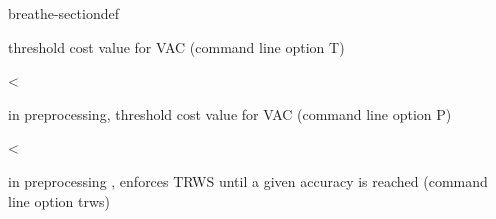 \documentclass[letterpaper,10pt,openany,oneside,english]{sphinxmanual}
\begin{document}
\begin{fulllineitems}
\begin{sphinxuseclass}{breathe-sectiondef}
\begin{fulllineitems}
\sphinxAtStartPar
threshold cost value for VAC (command line option \sphinxhyphen{}T) 

\end{fulllineitems}


\begin{fulllineitems}
\label{\detokenize{ref/ref_cpp:_CPPv4N8ToulBar212trwsAccuracyE}}\label{\detokenize{ref/ref_cpp:_CPPv3N8ToulBar212trwsAccuracyE}}\label{\detokenize{ref/ref_cpp:_CPPv2N8ToulBar212trwsAccuracyE}}\label{\detokenize{ref/ref_cpp:ToulBar2::trwsAccuracy__double}}
\pysigstartsignatures
\pysigstartmultiline
{}
\pysigstopmultiline
\pysigstopsignatures
\sphinxAtStartPar
\textless{} 

\sphinxAtStartPar
in preprocessing, threshold cost value for VAC (command line option \sphinxhyphen{}P) 

\end{fulllineitems}


\begin{fulllineitems}
\label{\detokenize{ref/ref_cpp:_CPPv4N8ToulBar29trwsOrderE}}\label{\detokenize{ref/ref_cpp:_CPPv3N8ToulBar29trwsOrderE}}\label{\detokenize{ref/ref_cpp:_CPPv2N8ToulBar29trwsOrderE}}\label{\detokenize{ref/ref_cpp:ToulBar2::trwsOrder__b}}
\pysigstartsignatures
\pysigstartmultiline
{}
\pysigstopmultiline
\pysigstopsignatures
\sphinxAtStartPar
\textless{} 

\sphinxAtStartPar
in preprocessing , enforces TRW\sphinxhyphen{}S until a given accuracy is reached (command line option \sphinxhyphen{}trws) 

\end{fulllineitems}



\end{sphinxuseclass}
\end{fulllineitems}
\end{document}
